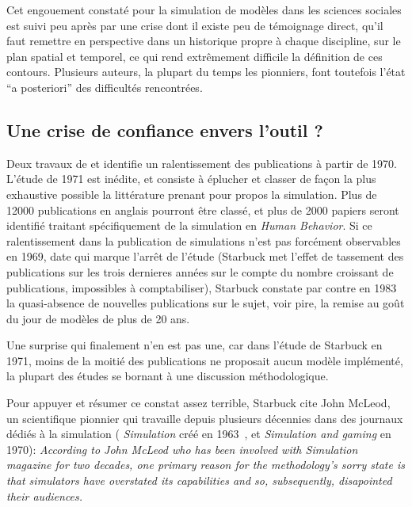 Cet engouement constaté pour la simulation de modèles dans les sciences sociales est suivi peu après par une crise dont il existe peu de témoignage direct, qu'il faut remettre en perspective dans un historique propre à chaque discipline, sur le plan spatial et temporel, ce qui rend extrêmement difficile la définition de ces contours. Plusieurs auteurs, la plupart du temps les pionniers, font toutefois l'état \foreignquote{latin}{a posteriori} des difficultés rencontrées.


\subsection{Une crise de confiance envers l'outil ?}
\label{ssec:critiques_simulation}

Deux travaux de \textcite{Dutton1971} et \textcite{Starbuck1983} identifie un ralentissement des publications à partir de 1970. L'étude de 1971 est inédite, et consiste à éplucher et classer de façon la plus exhaustive possible la littérature prenant pour propos la simulation. Plus de 12000 publications en anglais pourront être classé, et plus de 2000 papiers seront identifié traitant spécifiquement de la simulation en \textit{Human Behavior}. Si ce ralentissement dans la publication de simulations n'est pas forcément observables en 1969, date qui marque l'arrêt de l'étude (Starbuck met l'effet de tassement des publications sur les trois dernieres années sur le compte du nombre croissant de publications, impossibles à comptabiliser), Starbuck constate par contre en 1983 la quasi-absence de nouvelles publications sur le sujet, voir pire, la remise au goût du jour de modèles de plus de 20 ans.

Une surprise qui finalement n'en est pas une, car dans l'étude de Starbuck en 1971, moins de la moitié des publications ne proposait aucun modèle implémenté, la plupart des études se bornant à une discussion méthodologique.

Pour appuyer et résumer ce constat assez terrible, Starbuck cite John McLeod, un scientifique pionnier qui travaille depuis plusieurs décennies dans des journaux dédiés à la simulation ( \textit{Simulation} créé en 1963 , et \textit{Simulation and gaming} en 1970): \textit{According to  John McLeod who has been involved with Simulation magazine for two decades, one primary reason for the methodology's sorry state is that simulators have overstated its capabilities and so, subsequently, disapointed their audiences.}

